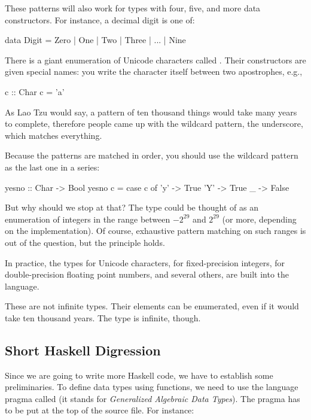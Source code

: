 \documentclass[DaoFP]{subfiles}
\begin{document}
These patterns will also work for types with four, five, and more data constructors. For instance, a decimal digit is one of:
\begin{haskell}
data Digit = Zero | One | Two | Three | ... | Nine
\end{haskell}

There is a giant enumeration of Unicode characters called . Their constructors are given special names: you write the character itself between two apostrophes, e.g.,
\begin{haskell}
c :: Char
c = 'a'
\end{haskell}

As Lao Tzu would say, a pattern of ten thousand things would take many years to complete, therefore people came up with the wildcard pattern, the underscore, which matches everything. 

Because the patterns are matched in order, you should use the wildcard pattern as the last one in a series:
\begin{haskell}
yesno :: Char -> Bool
yesno c = case c of
  'y' -> True
  'Y' -> True
  _   -> False
\end{haskell}

But why should we stop at that? The type  could be thought of as an enumeration of integers in the range between $-2^{29}$ and $2^{29}$ (or more, depending on the implementation). Of course, exhaustive pattern matching on such ranges is out of the question, but the principle holds. 

In practice, the types  for Unicode characters,  for fixed-precision integers,  for double-precision floating point numbers, and several others, are built into the language.

These are not infinite types. Their elements can be enumerated, even if it would take ten thousand years. The type  is infinite, though.

\subsection{Short Haskell Digression}

Since we are going to write more Haskell code, we have to establish some preliminaries. To define data types using functions, we need to use the language pragma called  (it stands for \emph{Generalized Algebraic Data Types}). The pragma has to be put at the top of the source file. For instance:
\end{document}
